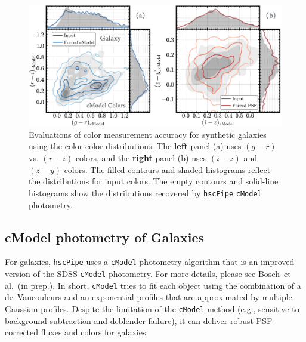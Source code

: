 \documentclass[useamsfonts]{pasj01}
\def\etal{{\ et al.~}}
\def\hscpipe{\texttt{hscPipe}}
\def\cmodel{\texttt{cModel}}
\begin{document}
\begin{figure}
    \begin{center}
        \includegraphics[width=\textwidth]{fig/synpipe_galaxy_cdist}
    \end{center}
    \caption{
        Evaluations of color measurement accuracy for synthetic galaxies
        using the color-color distributions.
        The \textbf{left} panel (a) uses $(g-r)$ vs. $(r-i)$ colors, and the 
        \textbf{right} panel (b) uses $(i-z)$ and $(z-y)$ colors.
        The filled contours and shaded histograms reflect the distributions for input
        colors.
        The empty contours and solid-line histograms show the distributions recovered
        by \hscpipe{} \cmodel{} photometry.
        }
    \label{fig:cmodel_cdist}
\end{figure}

\subsection{cModel photometry of Galaxies}
    \label{ssec:cmodel}

    For galaxies, \hscpipe{} uses a \cmodel{} photometry algorithm that is an improved 
    version of the SDSS \cmodel{} photometry.
    For more details, please see Bosch\etal (in prep.).
    In short, \cmodel{} tries to fit each object using the combination of a
    de~Vaucouleurs and an exponential profiles that are approximated by multiple 
    Gaussian profiles.
    Despite the limitation of the \cmodel{} method (e.g., sensitive to background
    subtraction and deblender failure), it can deliver robust PSF-corrected fluxes and
    colors for galaxies.
\end{document}
